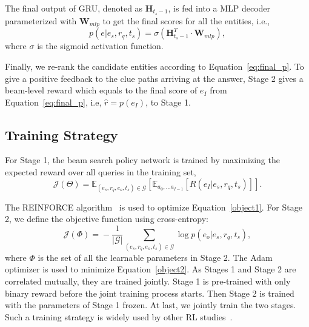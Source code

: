 \documentclass[11pt,a4paper]{article}
\begin{document}
The final output of GRU, denoted as $\mathbf{H}_{t_{s}-1}$, is fed into a MLP
decoder parameterized with $\mathbf{W}_{mlp}$ to get the final scores for all the
entities, i.e.,
%
\begin{equation}\label{eq:final_p}
p(e|e_{s},r_{q},t_{s})
= \sigma (\mathbf{H}_{t_{s}-1}^{T} \cdot \mathbf{W}_{mlp}),
\end{equation}
%
where $\sigma$ is the sigmoid activation function.

Finally, we re-rank the candidate entities according to
Equation~\ref{eq:final_p}. To give a positive feedback to the clue paths
arriving at the answer, Stage 2 gives a beam-level reward which
equals to the final score of $e_{I}$ from Equation~\ref{eq:final_p}, i.e, $\hat{r} = p(e_{I})$, to Stage 1.




\subsection{Training Strategy}
For Stage 1, the beam search policy network is trained by maximizing the
expected reward over all queries in the training set,
%
\begin{equation}
\mathcal{J}(\Theta) \!\!= \!\!\mathbb{E}_{(e_s, r_q, e_o, t_s)\in \mathcal{G}}[\mathbb{E}_{a_0,...a_{I-1}}[R(e_I|e_s,r_q,t_s)]]. \label{object1}
\end{equation}
%

The REINFORCE algorithm~\cite{williams1992simple} is used to optimize
Equation~\ref{object1}. For Stage 2, we define the objective function using
cross-entropy:
%
\begin{equation}
  \mathcal{J}(\Phi) \!=\!-\frac{1}{|\mathcal{G}|}\sum_{(e_s, r_q, e_o, t_s)\in \mathcal{G}}\!\!\log p(e_o|e_s,r_q,t_s), \label{object2}
\end{equation}
%
where $\Phi$ is the set of all the learnable parameters in Stage 2. The
Adam~\cite{kingma2014adam} optimizer is used to minimize Equation~\ref{object2}.
As Stages 1 and Stage 2 are correlated mutually, they are trained jointly. Stage
1 is pre-trained with only binary reward before the joint training process
starts. Then Stage 2 is trained with the parameters of Stage 1 frozen. At last,
we jointly train the two stages. Such a training strategy is widely used by
other RL studies~\cite{bahdanau2016actor,feng2018reinforcement}.
\end{document}

